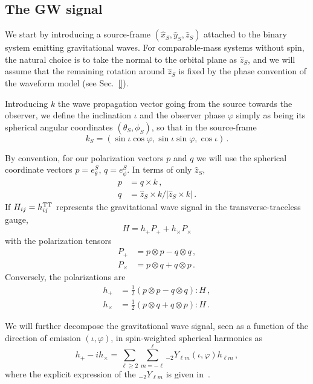 \documentclass[aps,showpacs,twocolumn,prd,superscriptaddress,nofootinbib]{revtex4-1}
\newcommand{\be}{\begin{equation}}
\newcommand{\ee}{\end{equation}}
\newcommand{\bsub}{\begin{subequations}}
\newcommand{\esub}{\end{subequations}}
\begin{document}

\subsection{The GW signal}
\label{sec:gwsignal}

We start by introducing a source-frame $(\hat{x}_{S}, \hat{y}_{S}, \hat{z}_{S})$ attached to the binary system emitting gravitational waves. For comparable-mass systems without spin, the natural choice is to take the normal to the orbital plane as $\hat{z}_{S}$, and we will assume that the remaining rotation around $\hat{z}_{S}$ is fixed by the phase convention of the waveform model (see Sec.~\ref{}).

Introducing $k$ the wave propagation vector going from the source towards the observer, we define the inclination $\iota$ and the observer phase $\varphi$ simply as being its spherical angular coordinates $(\theta_{S}, \phi_{S})$, so that in the source-frame
\be
	k_{S} = (\sin\iota \cos\varphi, \sin\iota \sin\varphi, \cos\iota) \,.
\ee

By convention, for our polarization vectors $p$ and $q$ we will use the spherical coordinate vectors $p = e_{\theta}^{S}$, $q = e_{\phi}^{S}$. In terms of only $\hat{z}_{S}$,
\bsub
\begin{align}
	p &= q \times k \,,\\
	q &= \hat{z}_{S} \times k / |\hat{z}_{S} \times k|\,.
\end{align}
\esub
If $H_{ij} = h_{ij}^{\rm TT}$ represents the gravitational wave signal in the transverse-traceless gauge,
\be
	H = h_{+} P_{+} + h_{\times} P_{\times}
\ee
with the polarization tensors
\bsub
\begin{align}
	P_{+} &= p \otimes p - q \otimes q \,,\\
	P_{\times} &= p \otimes q + q \otimes p \,.
\end{align}
\esub
Conversely, the polarizations are
\bsub
\begin{align}
	h_{+} &= \frac{1}{2} \left(p \otimes p - q \otimes q \right) : H \,,\\
	h_{\times} &= \frac{1}{2} \left( p \otimes q + q \otimes p \right) : H \,.
\end{align}
\esub

We will further decompose the gravitational wave signal, seen as a function of the direction of emission $(\iota, \varphi)$, in spin-weighted spherical harmonics as
\be\label{eq:hpcmodes}
	h_{+} - i h_{\times} = \sum_{\ell \geq 2} \sum_{m = -\ell}^{\ell} {}_{-2}Y_{\ell m} (\iota, \varphi) h_{\ell m} \,,
\ee
where the explicit expression of the ${}_{-2}Y_{\ell m}$ is given in~\cite{}.
\end{document}
